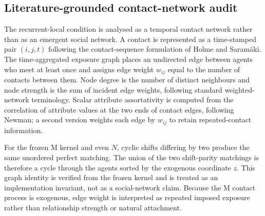 \subsection*{Literature-grounded contact-network audit}
The recurrent-local condition is analysed as a temporal contact network rather than as an emergent social network. A contact is represented as a time-stamped pair $(i,j,t)$ following the contact-sequence formulation of Holme and Saram\"aki. The time-aggregated exposure graph places an undirected edge between agents who meet at least once and assigns edge weight $w_{ij}$ equal to the number of contacts between them. Node degree is the number of distinct neighbours and node strength is the sum of incident edge weights, following standard weighted-network terminology. Scalar attribute assortativity is computed from the correlation of attribute values at the two ends of contact edges, following Newman; a second version weights each edge by $w_{ij}$ to retain repeated-contact information.

For the frozen M kernel and even $N$, cyclic shifts differing by two produce the same unordered perfect matching. The union of the two shift-parity matchings is therefore a cycle through the agents sorted by the exogenous coordinate $z$. This graph identity is verified from the frozen kernel and is treated as an implementation invariant, not as a social-network claim. Because the M contact process is exogenous, edge weight is interpreted as repeated imposed exposure rather than relationship strength or natural attachment.

